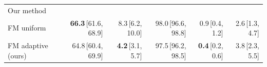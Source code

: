 \begin{tabular}{lrrrrr}
\multicolumn{6}{l}{\footnotesize\color{black!55} Our method} \\
FM uniform & \textbf{66.3}\,{\scriptsize\color{black!55}[61.6, 68.9]} & 8.3\,{\scriptsize\color{black!55}[6.2, 10.0]} & 98.0\,{\scriptsize\color{black!55}[96.6, 98.8]} & 0.9\,{\scriptsize\color{black!55}[0.4, 1.2]} & 2.6\,{\scriptsize\color{black!55}[1.3, 4.7]} \\
FM adaptive (ours) & 64.8\,{\scriptsize\color{black!55}[60.4, 69.9]} & \textbf{4.2}\,{\scriptsize\color{black!55}[3.1, 5.7]} & 97.5\,{\scriptsize\color{black!55}[96.2, 98.5]} & \textbf{0.4}\,{\scriptsize\color{black!55}[0.2, 0.6]} & 3.8\,{\scriptsize\color{black!55}[2.3, 5.5]} \\
\bottomrule
\end{tabular}
